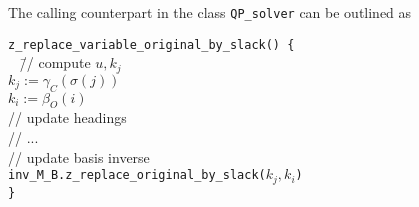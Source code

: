 \documentclass[a4paper]{article}
\begin{document}
The calling counterpart in the class \texttt{QP\_solver} can be outlined as
\begin{tabbing}
\texttt{z\_replace\_variable\_original\_by\_slack() \{} \\
\texttt{  } \= // compute $u, k_{j}$ \\
\> \texttt{$k_{j}:=\gamma_{C}(\sigma(j))$} \\
\> \texttt{$k_{i}:=\beta_{O}(i)$} \\
\> // update headings \\
\> // ... \\
\> // update basis inverse \\
\> \texttt{inv\_M\_B.z\_replace\_original\_by\_slack($k_{j}, k_{i}$)}
\\
\texttt{\}}
\end{tabbing}
\end{document}
